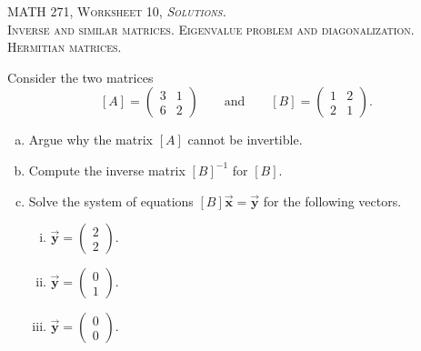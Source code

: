 \documentclass[12pt]{article} %
\begin{document}
\begin{center}
   \textsc{\large MATH 271, Worksheet 10, \emph{Solutions.}}\\
   \textsc{Inverse and similar matrices. Eigenvalue problem and diagonalization. Hermitian matrices.}
\end{center}
\vspace{.5cm}


\begin{problem}
Consider the two matrices 
\[
[A] = \begin{pmatrix} 3 & 1 \\ 6 & 2 \end{pmatrix} \qquad \textrm{and} \qquad [B] = \begin{pmatrix} 1 & 2\\ 2 & 1 \end{pmatrix}.
\]
\begin{enumerate}[(a)]
    \item Argue why the matrix $[A]$ cannot be invertible.
    \item Compute the inverse matrix $[B]^{-1}$ for $[B]$.  
    \item Solve the system of equations $[B]\vec{\boldsymbol{x}} = \vec{\boldsymbol{y}}$ for the following vectors.
    \begin{enumerate}[i.]
        \item $\vec{\boldsymbol{y}} = \begin{pmatrix} 2 \\ 2 \end{pmatrix}$.
        \item $\vec{\boldsymbol{y}} = \begin{pmatrix} 0 \\ 1 \end{pmatrix}$.
        \item $\vec{\boldsymbol{y}} = \begin{pmatrix} 0 \\ 0 \end{pmatrix}$.
    \end{enumerate}
\end{enumerate}
\end{problem}
\end{document}

